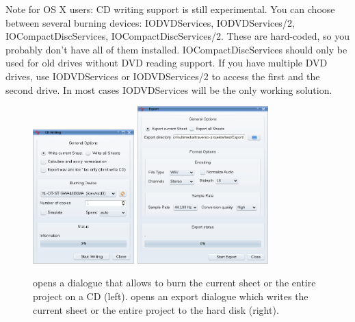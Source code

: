 Note for OS X users: CD writing support is still experimental. You can choose between several burning devices: IODVDServices, IODVDServices/2, IOCompactDiscServices, IOCompactDiscServices/2. These are hard-coded, so you probably don't have all of them installed. IOCompactDiscServices should only be used for old drives without DVD reading support. If you have multiple DVD drives, use IODVDServices or IODVDServices/2 to access the first and the second drive. In most cases IODVDServices will be the only working solution.

\begin{figure}[t]
 \centering
 \includegraphics[width=0.35\textwidth]{../images/exportdlg}\qquad
 \includegraphics[width=0.45\textwidth]{../images/exportdlg1}
 \caption{ opens a dialogue that allows to burn the current sheet or the entire project on a CD (left).  opens an export dialogue which writes the current sheet or the entire project to the hard disk (right).}
 \label{fig_exportdlg}
\end{figure}


